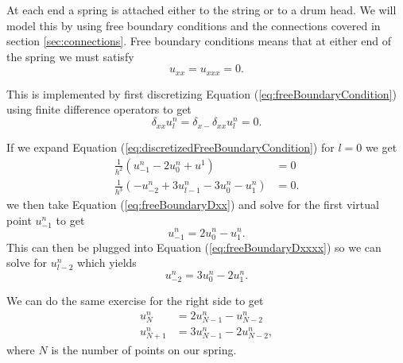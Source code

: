 \documentclass{article}
\begin{document}
At each end a spring is attached either to the string or to a drum head.
We will model this by using free boundary conditions and the connections covered in section \ref{sec:connections}.
Free boundary conditions means that at either end of the spring we must satisfy
\begin{equation}
  \label{eq:freeBoundaryCondition}
  u_{xx} = u_{xxx} = 0.
\end{equation}

This is implemented by first discretizing Equation (\ref{eq:freeBoundaryCondition}) using finite difference operators to get
\begin{equation}
  \label{eq:discretizedFreeBoundaryCondition}
  \delta_{xx} u^n_l = \delta_{x-}\delta_{xx} u^n_l = 0.
\end{equation}

If we expand Equation (\ref{eq:discretizedFreeBoundaryCondition}) for $l = 0$ we get
\begin{align}
  \frac{1}{h^2} (u^n_{-1} - 2 u^{n}_0 + u^{1}) &= 0 \label{eq:freeBoundaryDxx}\\
  \frac{1}{h^3} (-u^n_{-2} + 3u^n_{l-1} - 3u^n_0 - u^n_{1}) &= 0 \label{eq:freeBoundaryDxxxx}.
\end{align}
we then take Equation (\ref{eq:freeBoundaryDxx}) and solve for the first virtual point $u^n_{-1}$ to get
\begin{equation}
  u^n_{-1} = 2 u^n_0 - u^n_1.
\end{equation}
This can then be plugged into Equation (\ref{eq:freeBoundaryDxxxx}) so we can solve for $u^n_{l-2}$ which yields
\begin{equation}
  u^n_{-2} = 3 u^n_0 - 2u^n_1.
\end{equation}

We can do the same exercise for the right side to get
\begin{align}
  u^n_{N} &= 2 u^n_{N-1} - u^n_{N-2}\\
  u^n_{N+1} &= 3 u^n_{N-1} - 2 u^n_{N-2},
\end{align}
where $N$ is the number of points on our spring.
\end{document}
